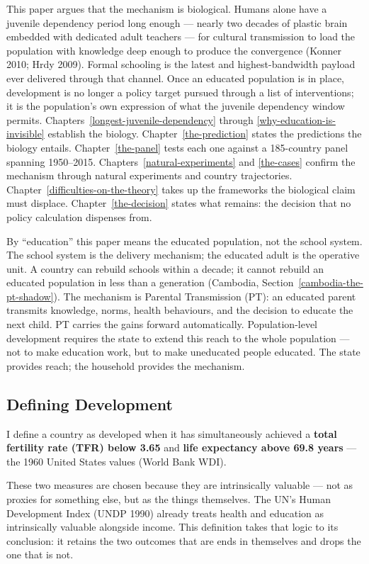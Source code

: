 \documentclass[12pt,letterpaper]{article}
\begin{document}
This paper argues that the mechanism is biological. Humans alone have
a juvenile dependency period long enough --- nearly two decades of
plastic brain embedded with dedicated adult teachers --- for cultural
transmission to load the population with knowledge deep enough to
produce the convergence (Konner 2010; Hrdy 2009). Formal schooling is
the latest and highest-bandwidth payload ever delivered through that
channel. Once an educated population is in place, development is no
longer a policy target pursued through a list of interventions; it is
the population's own expression of what the juvenile dependency window
permits. Chapters~\ref{longest-juvenile-dependency} through
\ref{why-education-is-invisible} establish the biology.
Chapter~\ref{the-prediction} states the predictions the biology
entails. Chapter~\ref{the-panel} tests each one against a 185-country
panel spanning 1950--2015.
Chapters~\ref{natural-experiments} and \ref{the-cases} confirm the
mechanism through natural experiments and country trajectories.
Chapter~\ref{difficulties-on-the-theory} takes up the frameworks the
biological claim must displace. Chapter~\ref{the-decision} states what
remains: the decision that no policy calculation dispenses from.

By ``education'' this paper means the educated population, not the
school system. The school system is the delivery mechanism; the
educated adult is the operative unit. A country can rebuild schools
within a decade; it cannot rebuild an educated population in less than
a generation (Cambodia,
Section~\ref{cambodia-the-pt-shadow}). The mechanism is Parental
Transmission (PT): an educated parent transmits knowledge, norms,
health behaviours, and the decision to educate the next child. PT
carries the gains forward automatically. Population-level development
requires the state to extend this reach to the whole population ---
not to make education work, but to make uneducated people educated.
The state provides reach; the household provides the mechanism.

\subsection{Defining Development}\label{defining-development}

I define a country as developed when it has simultaneously achieved a
\textbf{total fertility rate (TFR) below 3.65} and \textbf{life
expectancy above 69.8 years} --- the 1960 United States values (World
Bank WDI).

These two measures are chosen because they are intrinsically valuable
--- not as proxies for something else, but as the things themselves.
The UN's Human Development Index (UNDP 1990) already treats health
and education as intrinsically valuable alongside income. This
definition takes that logic to its conclusion: it retains the two
outcomes that are ends in themselves and drops the one that is not.
\end{document}
